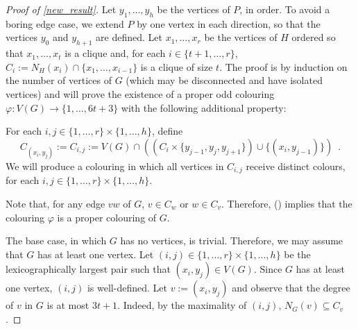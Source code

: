 \documentclass{patmorin}
\begin{document}
\begin{proof}[Proof of \cref{new_result}]
  Let $y_1,\ldots,y_h$ be the vertices of $P$, in order.  To avoid a boring edge case, we extend $P$ by one vertex in each direction, so that the vertices $y_0$ and $y_{h+1}$ are defined.  Let $x_1,\ldots,x_r$ be the vertices of $H$ ordered so that $x_1,\ldots,x_{t}$ is a clique and, for each $i\in\{t+1,\ldots,r\}$, $C_i:=N_H(x_i)\cap\{x_1,\ldots,x_{i-1}\}$ is a clique of size $t$.  The proof is by induction on the number of vertices of $G$ (which may be disconnected and have isolated vertices) and will prove the existence of a proper odd colouring $\varphi:V(G)\to\{1,\ldots,6t+3\}$ with the following additional property:
  \begin{compactitem}[(\ding{96})]
    \item For each $i,j\in\{1,\ldots,r\}\times \{1,\ldots,h\}$, define
    \[
      C_{(x_i,y_j)}:=C_{i,j}:=V(G)\cap \left((C_i\times\{y_{j-1}, y_{j},y_{j+1}\}) \cup \{(x_i,y_{j-1})\}\right)
      \enspace .
    \]
    We will produce a colouring in which all vertices in $C_{i,j}$ receive distinct colours, for each $i,j\in\{1,\ldots,r\}\times\{1,\ldots,h\}$.
  \end{compactitem}
  Note that, for any edge $vw$ of $G$, $v \in C_w$ or $w\in C_v$.  Therefore, () implies that the colouring $\varphi$ is a proper colouring of $G$.



  The base case, in which $G$ has no vertices, is trivial. Therefore, we may assume that $G$ has at least one vertex.  Let $(i,j)\in\{1,\ldots,r\}\times\{1,\ldots,h\}$ be the lexicographically largest pair such that $(x_i,y_j)\in V(G)$.  Since $G$ has at least one vertex, $(i,j)$ is well-defined.  Let $v:=(x_i,y_j)$ and observe that the degree of $v$ in $G$ is at most $3t+1$. Indeed, by the maximality of $(i,j)$,  $N_G(v)\subseteq C_v$.


\end{proof}
\end{document}
